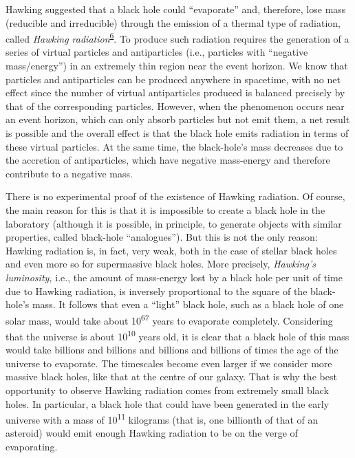 Hawking suggested that a black hole could ``evaporate'' and, therefore, lose mass
(reducible and irreducible) through the emission of a thermal type of radiation, called
\emph{Hawking radiation}\textsuperscript{\hyperlink{note:06-06}{6}}. To
produce such radiation requires the generation of a series of virtual particles and
antiparticles (i.e., particles with ``negative mass/energy'') in an
extremely thin region near the event horizon. We know that particles and antiparticles
can be produced anywhere in spacetime, with no net effect since the number of virtual
antiparticles produced is balanced precisely by that of the corresponding particles.
However, when the phenomenon occurs near an event horizon, which can only absorb
particles but not emit them, a net result is possible and the overall effect is that the
black hole emits radiation in terms of these virtual particles. At the same time, the
black-hole's mass decreases due to the accretion of antiparticles, which have negative
mass-energy and therefore contribute to a negative mass.

There is no experimental proof of the existence of Hawking radiation.
Of course, the main reason for this is that it is impossible to create a black hole in
the laboratory (although it is possible, in principle, to generate objects with similar
properties, called black-hole ``analogues''). But this is not the only reason: Hawking
radiation is, in fact, very weak, both in the case of stellar black
holes and even more so for supermassive black holes. More precisely,
\emph{Hawking's luminosity}\emph{,} i.e., the amount
of mass-energy lost by a black hole per unit of time due to Hawking radiation, is
inversely proportional to the square of the black-hole's mass. It follows that even a
``light'' black hole, such as a black hole of one solar mass, would take about
10\textsuperscript{67} years to evaporate completely. Considering that the universe is
about 10\textsuperscript{10} years old, it is clear that a black hole of this mass would
take billions and billions and billions and billions of times the age of the universe to
evaporate. The timescales become even larger if we consider more massive black holes,
like that at the centre of our galaxy. That is why the best opportunity to observe
Hawking radiation comes from extremely small black holes. In particular, a black hole
that could have been generated in the early universe with a mass of
10\textsuperscript{11} kilograms (that is, one billionth of that of an asteroid) would
emit enough Hawking radiation to be on the verge of evaporating.

